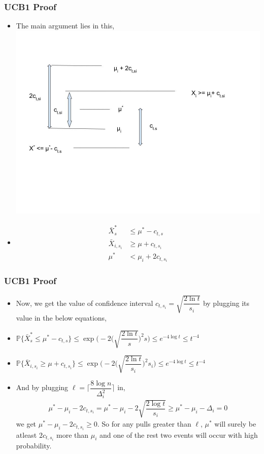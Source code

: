 \begin{frame}
\frametitle{UCB1 Proof}
\begin{itemize}
\item<1-> The main argument lies in this, 
\includegraphics[scale=0.19]{img/UCB1_pic} 
\item<1-> \begin{align*}
\bar{X}^{*}_{s}&\leq \mu^* - c_{t,s}\\
\bar{X}_{i,s_i}&\geq \mu + c_{t,s_i}\\
\mu^* & < \mu_i + 2c_{t,s_i}
\end{align*}
\end{itemize}
\end{frame}

\begin{frame}
\frametitle{UCB1 Proof}
\begin{itemize}
\item<0-> Now, we get the value of confidence interval $c_{t,s_i}=\sqrt{\dfrac{2\ln t}{s_i}}$ by plugging its value in the below equations,
\item<1-> $\mathbb{P}\lbrace  \bar{X}^{*}_{s}\leq \mu^* - c_{t,s}\rbrace\leq \exp\bigg(-2\big(\sqrt{\dfrac{2\ln t}{s}}\big)^2 s\bigg) \leq e^{-4\log t} \leq t^{-4}$
\item<2-> $\mathbb{P}\lbrace \bar{X}_{i,s_i} \geq \mu + c_{t,s_i}\rbrace\leq \exp\bigg(-2\big(\sqrt{\dfrac{2\ln t}{s_i}}\big)^2 s_i\bigg) \leq e^{-4\log t} \leq t^{-4}$
\item<3-> And by plugging $\ell=\bigg\lceil \dfrac{8\log n}{\Delta_{i}^{2}}\bigg\rceil$ in,
\begin{align*}
\mu^* - \mu_i - 2c_{t,s_i} = \mu^* - \mu_i - 2\sqrt{\dfrac{2\log t}{s_i}} \geq \mu^* - \mu_i -\Delta_i =0
\end{align*} 
we get $\mu^* - \mu_i - 2c_{t,s_i} \geq 0$. So for any pulls greater than $\ell$, $\mu^*$ will surely be atleast $2c_{t,s_i}$  more than $\mu_i$ and one of the rest two events will occur with high probability.
\end{itemize}
\end{frame}


